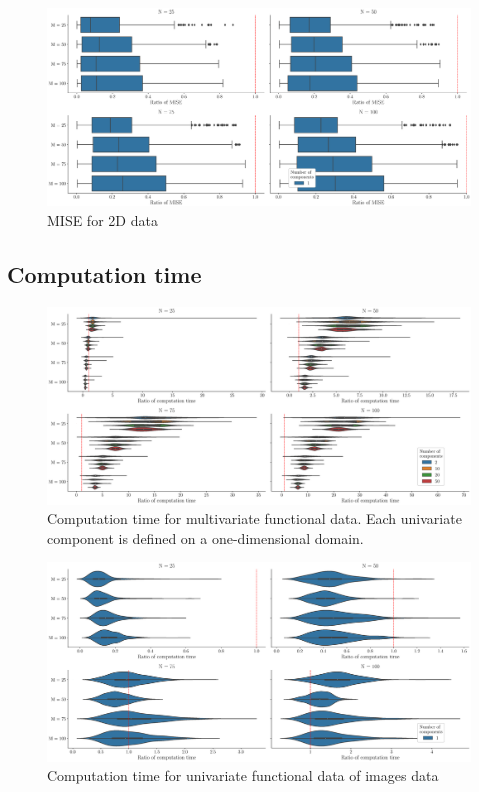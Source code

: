 \begin{figure}
    \centering
    \includegraphics[scale=0.25]{figures/mise_p1.eps}
    \caption{MISE for 2D data}
    \label{fig:mise_fd_2d}
\end{figure}



\subsection{Computation time} %
\label{sub:computation_time}

\begin{figure}
    \centering
    \includegraphics[scale=0.25]{figures/computation_time_pall.eps}
    \caption{Computation time for multivariate functional data. Each univariate component is defined on a one-dimensional domain.}
    \label{fig:computation_time_mfd_1d}
\end{figure}

\begin{figure}
    \centering
    \includegraphics[scale=0.25]{figures/computation_time_p1.eps}
    \caption{Computation time for univariate functional data of images data}
    \label{fig:computation_time_fd_2d}
\end{figure}

